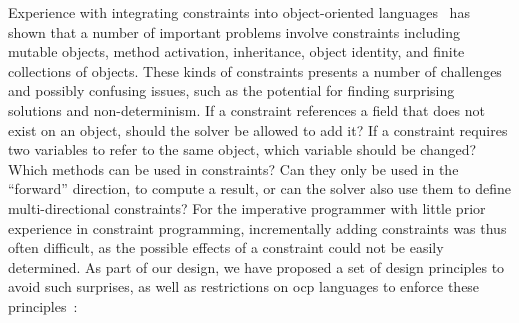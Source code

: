 Experience with integrating constraints into object-oriented languages~\cite{freeman-benson-oopsla-1990,
  freeman-benson-iccl-1992, freeman-benson-ecoop-1992, lopez-ecoop-1994} has shown that
a number of important problems involve constraints including mutable
objects, method activation, inheritance, object identity, and finite
collections of objects. These kinds of constraints presents a number
of challenges and possibly confusing issues, such as the potential for
finding surprising solutions and non-determinism. If a constraint
references a field that does not exist on an object, should the solver
be allowed to add it? If a constraint requires two variables to refer
to the same object, which variable should be changed? Which methods
can be used in constraints?  Can they only be used in the ``forward''
direction, to compute a result, or can the solver also use them to
define multi-directional constraints?  For the imperative programmer
with little prior experience in constraint programming, incrementally
adding constraints was thus often difficult, as the possible effects
of a constraint could not be easily determined. As part of our design,
we have proposed a set of design principles to avoid such surprises,
as well as restrictions on \ac{ocp} languages to enforce these
principles~\cite{FelgentreffOOPSLA2015}:

